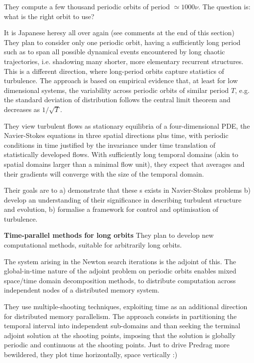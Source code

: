 They compute a few thousand periodic orbits of period $\simeq 1000 \nu$. The
question is: what is the right orbit to use?

     {It is Japanese heresy all over again (see comments at the
                     end of this section)}
They plan to consider only one periodic orbit, having a sufficiently long period
such as to span all possible dynamical events encountered by long chaotic
trajectories, i.e. shadowing many shorter, more elementary recurrent structures.
This is a different direction, where long-period orbits capture statistics of
turbulence.
The approach is based on empirical evidence
that, at least for low dimensional systems, the
variability across periodic orbits of similar
period $T$, e.g. the standard deviation of distribution
follows
the central limit theorem and decreases as
$1/\sqrt{T}$.

They view
turbulent flows as stationary equilibria of a four-dimensional PDE,
the Navier-Stokes equations in three spatial directions plus time,
with periodic conditions in time justified by the invariance under
time translation of statistically developed flows. With
sufficiently long temporal domains (akin to spatial domains larger
than a minimal flow unit), they expect that averages and their
gradients will converge with the size of the temporal domain.

Their goals are to a) demonstrate that these \po s
exists in Navier-Stokes problems b) develop an
understanding of their significance in describing turbulent
structure and evolution, b)
formalise a framework for control and optimisation of turbulence.

{\bf Time-parallel methods for long orbits}
They plan to develop new computational methods, suitable for arbitrarily long
orbits.

The system arising in the Newton search iterations is the
adjoint of this.
The
global-in-time nature of the adjoint problem on periodic orbits
enables mixed space/time domain decomposition methods, to
distribute computation across independent nodes of a
distributed memory system.

They use multiple-shooting techniques, exploiting time as an
additional direction for distributed memory parallelism. The
approach consists in partitioning the temporal interval into
independent sub-domains and than seeking the terminal adjoint
solution at the shooting points, imposing that the solution is
globally periodic and continuous at the shooting points.
     {Just to drive Predrag more bewildered, they plot time
                     horizontally, space vertically :)}

